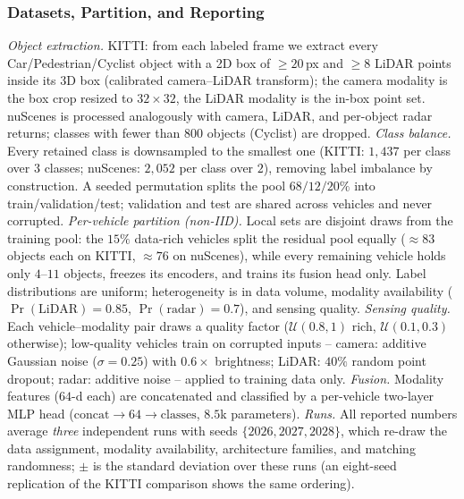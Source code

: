 \subsubsection{Datasets, Partition, and Reporting}
\emph{Object extraction.} KITTI: from each labeled frame we extract
every Car/Pedestrian/Cyclist object with a 2D box of $\ge 20$\,px and
$\ge 8$ LiDAR points inside its 3D box (calibrated
camera--LiDAR transform); the camera modality is the box crop resized
to $32{\times}32$, the LiDAR modality is the in-box point set. nuScenes
is processed analogously with camera, LiDAR, and per-object radar
returns; classes with fewer than $800$ objects (Cyclist) are dropped.
\emph{Class balance.} Every retained class is downsampled to the
smallest one (KITTI: $1{,}437$ per class over $3$ classes; nuScenes:
$2{,}052$ per class over $2$), removing label imbalance by
construction. A seeded permutation splits the pool $68/12/20\%$ into
train/validation/test; validation and test are shared across vehicles
and never corrupted.
\emph{Per-vehicle partition (non-IID).} Local sets are disjoint draws
from the training pool: the $15\%$ data-rich vehicles split the
residual pool equally (${\approx}83$ objects each on KITTI,
${\approx}76$ on nuScenes), while every remaining vehicle holds only
$4$--$11$ objects, freezes its encoders, and trains its fusion head
only. Label distributions are uniform; heterogeneity is in data volume,
modality availability ($\Pr(\text{LiDAR}){=}0.85$,
$\Pr(\text{radar}){=}0.7$), and sensing quality.
\emph{Sensing quality.} Each vehicle--modality pair draws a quality
factor ($\mathcal U(0.8,1)$ rich, $\mathcal U(0.1,0.3)$ otherwise);
low-quality vehicles train on corrupted inputs -- camera: additive
Gaussian noise ($\sigma{=}0.25$) with $0.6\times$ brightness; LiDAR:
$40\%$ random point dropout; radar: additive noise -- applied to
training data only.
\emph{Fusion.} Modality features ($64$-d each) are concatenated and
classified by a per-vehicle two-layer MLP head
($\mathrm{concat}\!\to\!64\!\to\!\text{classes}$, $8.5$k parameters).
\emph{Runs.} All reported numbers average \emph{three} independent
runs with seeds $\{2026, 2027, 2028\}$, which re-draw the data
assignment, modality availability, architecture families, and matching
randomness; $\pm$ is the standard deviation over these runs (an
eight-seed replication of the KITTI comparison shows the same ordering).
